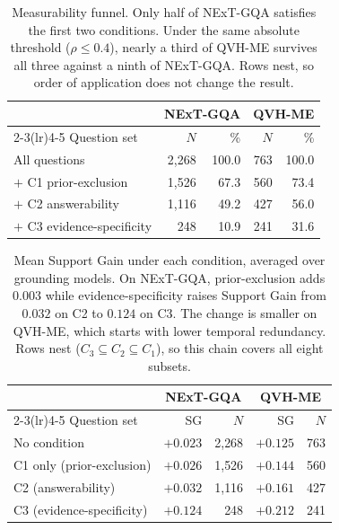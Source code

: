 
\providecommand{\und}{---}

\begin{table}[t]
\centering\small
\setlength{\tabcolsep}{4pt}
\begin{tabular}{@{}lrrrr@{}}
\toprule
 & \multicolumn{2}{c}{NExT-GQA} & \multicolumn{2}{c}{QVH-ME} \\
\cmidrule(lr){2-3}\cmidrule(lr){4-5}
Question set & $N$ & \% & $N$ & \% \\
\midrule
All questions & 2{,}268 & 100.0 & 763 & 100.0 \\
$+$ C1 prior-exclusion & 1{,}526 & 67.3 & 560 & 73.4 \\
$+$ C2 answerability & 1{,}116 & 49.2 & 427 & 56.0 \\
$+$ C3 evidence-specificity & 248 & 10.9 & 241 & 31.6 \\
\bottomrule
\end{tabular}
\caption{Measurability funnel. Only half of NExT-GQA satisfies the first
two conditions. Under the same absolute threshold ($\rho \le 0.4$),
nearly a third of QVH-ME survives all three against a ninth of
NExT-GQA. Rows nest, so order of application does not change the
result.}
\label{tab:funnel}
\end{table}

\begin{table}[t]
\centering\small
\begin{tabular}{@{}lrrrr@{}}
\toprule
 & \multicolumn{2}{c}{NExT-GQA} & \multicolumn{2}{c}{QVH-ME} \\
\cmidrule(lr){2-3}\cmidrule(lr){4-5}
Question set & SG & $N$ & SG & $N$ \\
\midrule
No condition & $+0.023$ & 2{,}268 & $+0.125$ & 763 \\
C1 only (prior-exclusion) & $+0.026$ & 1{,}526 & $+0.144$ & 560 \\
C2 (answerability) & $+0.032$ & 1{,}116 & $+0.161$ & 427 \\
C3 (evidence-specificity) & $+0.124$ & 248 & $+0.212$ & 241 \\
\bottomrule
\end{tabular}
\caption{Mean Support Gain under each condition, averaged over grounding
models. On NExT-GQA, prior-exclusion adds $0.003$ while
evidence-specificity raises Support Gain from $0.032$ on C2 to $0.124$
on C3. The change is smaller on QVH-ME, which starts with lower temporal
redundancy. Rows nest ($C_3 \subseteq C_2 \subseteq C_1$), so this chain
covers all eight subsets.}
\label{tab:ablation}
\end{table}

